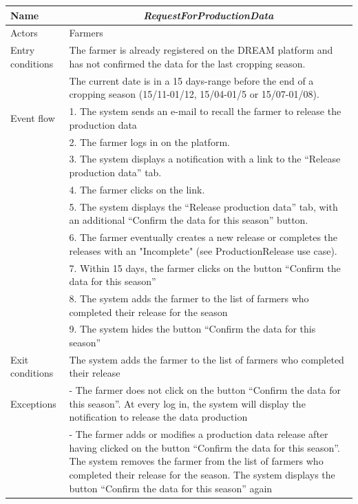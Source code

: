 \begin{table}[htbp]
	\centering
	\begin{tabularx}{\linewidth}{|l|X|}
		\hline
		Name & \multicolumn{1}{c|}{\textit{\textbf{RequestForProductionData}}}                                                   \tabularnewline \hline
		Actors                                               & Farmers                                                    \tabularnewline \hline
		Entry conditions                                        
		& The farmer is already registered on the DREAM platform and has not confirmed the data for the last cropping season.
		\tabularnewline
		&
		The current date is in a 15 days-range before the end of a cropping season (15/11-01/12, 15/04-01/5 or 15/07-01/08).
		\tabularnewline \hline
		Event flow                                         & 1.	The system sends an e-mail to recall the farmer to release the production data                                           \tabularnewline 
		& 2.	The farmer logs in on the platform.                                             \tabularnewline 
		& 3.	The system displays a notification with a link to the “Release production data” tab.                                           \tabularnewline 
		& 4.	The farmer clicks on the link.                                    \tabularnewline
		& 5.	The system displays the “Release production data” tab, with an additional “Confirm the data for this season” button.                                           \tabularnewline
		& 6.	The farmer eventually creates a new release or completes the releases with an "Incomplete" (see ProductionRelease use case).                                     \tabularnewline
		& 7.	Within 15 days, the farmer clicks on the button “Confirm the data for this season”                                \tabularnewline
		& 8.	The system adds the farmer to the list of farmers who completed their release for the season                              \tabularnewline
		& 9.	The system hides the button “Confirm the data for this season”                       \tabularnewline \hline
		Exit conditions 
		& The system adds the farmer to the list of farmers who completed their release 
		\tabularnewline \hline
		Exceptions 
		& 
		-	The farmer does not click on the button “Confirm the data for this season”. At every log in, the system will display the notification to release the data production
		\tabularnewline
		&
		-	The farmer adds or modifies a production data release after having clicked on the button “Confirm the data for this season”. The system removes the farmer from the list of farmers who completed their release for the season. The system displays the button “Confirm the data for this season” again
		\tabularnewline
		\hline
	\end{tabularx}   
\end{table}

